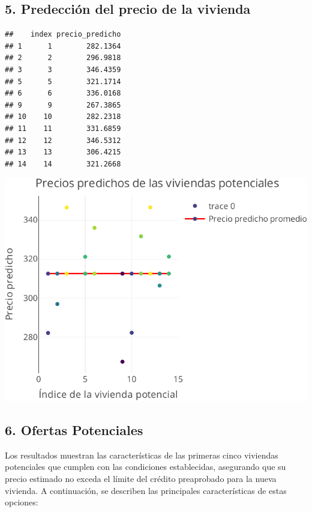 \documentclass[
]{article}
\begin{document}
\subsection{\texorpdfstring{\textbf{5. Predección del precio de la
vivienda}}{5. Predección del precio de la vivienda}}\label{predecciuxf3n-del-precio-de-la-vivienda}

\begin{verbatim}
##    index precio_predicho
## 1      1        282.1364
## 2      2        296.9818
## 3      3        346.4359
## 5      5        321.1714
## 6      6        336.0168
## 9      9        267.3865
## 10    10        282.2318
## 11    11        331.6859
## 12    12        346.5312
## 13    13        306.4215
## 14    14        321.2668
\end{verbatim}

\includegraphics{A2_U2_InformeEjecutivo_files/figure-latex/unnamed-chunk-22-1.pdf}

\subsection{\texorpdfstring{\textbf{6. Ofertas
Potenciales}}{6. Ofertas Potenciales}}\label{ofertas-potenciales}

Los resultados muestran las características de las primeras cinco
viviendas potenciales que cumplen con las condiciones establecidas,
asegurando que su precio estimado no exceda el límite del crédito
preaprobado para la nueva vivienda. A continuación, se describen las
principales características de estas opciones:
\end{document}
